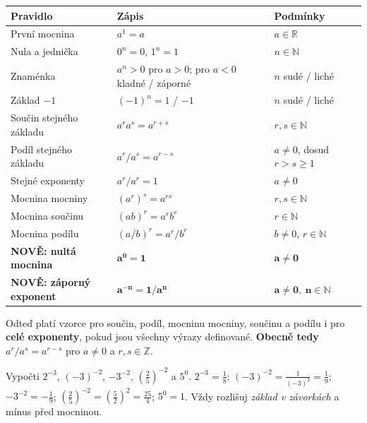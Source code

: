\documentclass[11pt,a4paper]{article}
\begin{document}
\begin{center}\scriptsize
\begin{tabularx}{\linewidth}{@{}>{\raggedright\arraybackslash}p{33mm}>{\raggedright\arraybackslash}p{49mm}X@{}}
\toprule
\textbf{Pravidlo} & \textbf{Zápis} & \textbf{Podmínky}\\\midrule
První mocnina & $a^1=a$ & $a\in\mathbb R$\\
Nula a jednička & $0^n=0$, $1^n=1$ & $n\in\mathbb N$\\
Znaménka & $a^n>0$ pro $a>0$; pro $a<0$ kladné / záporné & $n$ sudé / liché\\
Základ $-1$ & $(-1)^n=1$ / $-1$ & $n$ sudé / liché\\
Součin stejného základu & $a^r a^s=a^{r+s}$ & $r,s\in\mathbb N$\\
Podíl stejného základu & $a^r/a^s=a^{r-s}$ & $a\ne0$, dosud $r>s\ge1$\\
Stejné exponenty & $a^r/a^r=1$ & $a\ne0$\\
Mocnina mocniny & $(a^r)^s=a^{rs}$ & $r,s\in\mathbb N$\\
Mocnina součinu & $(ab)^r=a^rb^r$ & $r\in\mathbb N$\\
Mocnina podílu & $(a/b)^r=a^r/b^r$ & $b\ne0$, $r\in\mathbb N$\\\midrule
\textbf{NOVĚ: nultá mocnina} & $\boldsymbol{a^0=1}$ & $\boldsymbol{a\ne0}$\\
\textbf{NOVĚ: záporný exponent} & $\boldsymbol{a^{-n}=1/a^n}$ & $\boldsymbol{a\ne0,\ n\in\mathbb N}$\\\bottomrule
\end{tabularx}\normalsize\end{center}
Odteď platí vzorce pro součin, podíl, mocninu mocniny, součinu a podílu
i pro \textbf{celé exponenty}, pokud jsou všechny výrazy definované.
\textbf{Obecně tedy} $a^r/a^s=a^{r-s}$ pro $a\ne0$ a $r,s\in\mathbb Z$.

\begin{prikladReseniBox}[title={Příklad 1}]
Vypočti $2^{-3}$, $(-3)^{-2}$, $-3^{-2}$,
$\left(\frac25\right)^{-2}$ a $5^0$.
\tcblower
$2^{-3}=\frac18$; $(-3)^{-2}=\frac1{(-3)^2}=\frac19$;
$-3^{-2}=-\frac19$;
$\left(\frac25\right)^{-2}=\left(\frac52\right)^2=\frac{25}{4}$;
$5^0=1$. Vždy rozlišuj \emph{základ v závorkách} a mínus před mocninou.
\end{prikladReseniBox}
\end{document}

